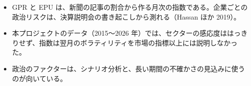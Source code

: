 \begin{keybox}[この章のまとめ]
\begin{itemize}
\item GPR と EPU は、新聞の記事の割合から作る月次の指数である。企業ごとの政治リスクは、決算説明会の書き起こしから測れる（Hassan ほか 2019）。
\item 本プロジェクトのデータ（2015〜2026 年）では、セクターの感応度ははっきりせず、指数は翌月のボラティリティを市場の指標以上には説明しなかった。
\item 政治のファクターは、シナリオ分析と、長い期間の不確かさの見込みに使うのが向いている。
\end{itemize}
\end{keybox}
